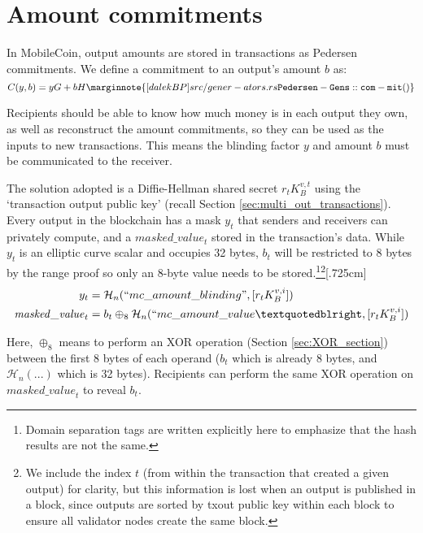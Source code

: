 \section{Amount commitments}
\label{sec:pedersen-ringct}

In MobileCoin, output amounts are stored in transactions as Pedersen commitments. We define a commitment to an output’s amount $b$ as:\vspace{.175cm}
\[C(y,b) = y G + b H\marginnote{[dalekBP] src/gener- ators.rs {\tt Pedersen- Gens::com- mit()}}\]

Recipients should be able to know how much money is in each output they own, as well as reconstruct the amount commitments, so they can be used as the inputs to new transactions. This means the blinding factor $y$ and amount $b$ must be communicated to the receiver.

The solution adopted is a Diffie-Hellman shared secret $r_t K_B^{v,t}$ using the `transaction output public key' (recall Section \ref{sec:multi_out_transactions}). Every output in the blockchain has a mask $y_t$ that senders and receivers can privately compute, and a $\mathit{masked\_value}_t$ stored in the transaction's data. While $y_t$ is an elliptic curve scalar and occupies 32 bytes, $b_t$ will be restricted to 8 bytes by the range proof so only an 8-byte value needs to be stored.\footnote{Domain separation tags are written explicitly here to emphasize that the hash results are not the same.}\footnote{We include the index $t$ (from within the transaction that created a given output) for clarity, but this information is lost when an output is published in a block, since outputs are sorted by txout public key within each block to ensure all validator nodes create the same block.}[.725cm]\vspace{.175cm}
\begin{align*}
  y_t &= \mathcal{H}_n(``mc\_amount\_blinding", [r_t K_B^{v,i}]) \\
  \mathit{masked\_value}_t &= b_t \oplus_8 \mathcal{H}_n(``mc\_amount\_value”, [r_t K_B^{v,i}])
\end{align*}

Here, $\oplus_8$ means to perform an XOR operation (Section \ref{sec:XOR_section}) between the first 8 bytes of each operand ($b_t$ which is already 8 bytes, and $\mathcal{H}_n(...)$ which is 32 bytes). Recipients can perform the same XOR operation on $\mathit{masked\_value}_t$ to reveal $b_t$.

